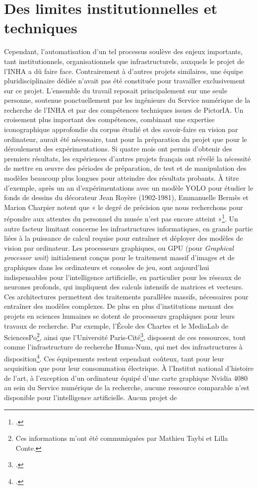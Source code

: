 \section[Des limites]{Des limites institutionnelles et techniques}
Cependant, l’automatisation d’un tel processus soulève des enjeux importants, tant institutionnels, organisationnels que infrastructurels, auxquels le projet de l’INHA a dû faire face. Contrairement à d’autres projets similaires, une équipe pluridisciplinaire dédiée n’avait pas été constituée pour travailler exclusivement sur ce projet. L’ensemble du travail reposait principalement sur une seule personne, soutenue ponctuellement par les ingénieurs du Service numérique de la recherche de l’INHA et par des compétences techniques issues de PictorIA. Un croisement plus important des compétences, combinant une expertise iconographique approfondie du corpus étudié et des savoir-faire en vision par ordinateur, aurait été nécessaire, tant pour la préparation du projet que pour le déroulement des expérimentations. Si quatre mois ont permis d’obtenir des premiers résultats, les expériences d’autres projets français ont révélé la nécessité de mettre en œuvre des périodes de préparation, de test et de manipulation des modèles beaucoup plus longues pour atteindre des résultats probants. À titre d’exemple, après un an d’expérimentations avec un modèle YOLO pour étudier le fonds de dessins du décorateur Jean Royère (1902-1981), Emmanuelle Bermès et Marion Charpier notent que « le degré de précision que nous recherchons pour répondre aux attentes du personnel du musée n’est pas encore atteint »\footcite{bermesRepenserCollectionsPatrimoniales2025}. Un autre facteur limitant concerne les infrastructures informatiques, en grande partie liées à la puissance de calcul requise pour entraîner et déployer des modèles de vision par ordinateur. Les processeurs graphiques, ou GPU (pour \textit{Graphical processor unit}) initialement conçus pour le traitement massif d’images et de graphiques dans les ordinateurs et consoles de jeu, sont aujourd’hui indispensables pour l’intelligence artificielle, en particulier pour les réseaux de neurones profonds, qui impliquent des calculs intensifs de matrices et vecteurs. Ces architectures permettent des traitements parallèles massifs, nécessaires pour entraîner des modèles complexes. De plus en plus d’institutions menant des projets en sciences humaines se dotent de processeurs graphiques pour leurs travaux de recherche. Par exemple, l’École des Chartes et le MediaLab de SciencesPo\footnote{Ces informations m’ont été communiquées par Mathieu Taybi et Lilla Conte.}, ainsi que l’Université Paris-Cité\footcite{universitepariscitePlateformeCalculHautePerformance}, disposent de ces ressources, tout comme l’infrastructure de recherche Huma-Num, qui met des infrastructures à disposition\footcite{huma-numInfrastructureMulticiblesPour2025}. Ces équipements restent cependant coûteux, tant pour leur acquisition que pour leur consommation électrique. À l’Institut national d’histoire de l’art, à l’exception d’un ordinateur équipé d’une carte graphique Nvidia 4080 au sein du Service numérique de la recherche, aucune ressource comparable n’est disponible pour l’intelligence artificielle. Aucun projet de 